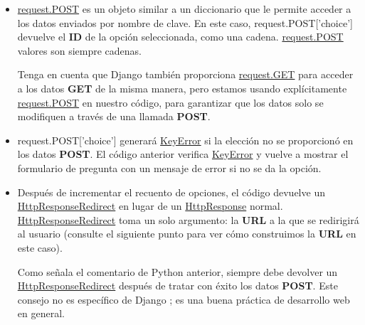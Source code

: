 \documentclass[10pt]{article}
\newcommand{\py}[1]{{\textcolor{B}{Python} #1}}
\newcommand{\django}[1]{{\textcolor{G}{Django} #1}}
\begin{document}
\begin{itemize}
\item
{\href{https://docs.djangoproject.com/en/3.0/ref/request-response/\#django.http.HttpRequest.POST}{\textcolor{B}{request.POST}}}
 es un objeto similar a un diccionario que le permite acceder a los datos enviados por nombre de clave. En este caso, \textcolor{G}{request.POST}\textcolor{R}{['choice']} devuelve el \textbf{ID} de la opción seleccionada, como una cadena. {\href{https://docs.djangoproject.com/en/3.0/ref/request-response/\#django.http.HttpRequest.POST}{\textcolor{B}{request.POST}}}
 valores son siempre cadenas.

Tenga en cuenta que \django también proporciona {\href{https://docs.djangoproject.com/en/3.0/ref/request-response/\#django.http.HttpRequest.GET}{\textcolor{B}{request.GET}}} para acceder a los datos \textbf{GET} de la misma manera, pero estamos usando explícitamente {\href{https://docs.djangoproject.com/en/3.0/ref/request-response/\#django.http.HttpRequest.POST}{\textcolor{B}{request.POST}}} en nuestro código, para garantizar que los datos solo se modifiquen a través de una llamada \textbf{POST}.

\item
\textcolor{G}{request.POST}\textcolor{R}{['choice']} generará {\href{https://docs.python.org/3/library/exceptions.html\#KeyError}{\textcolor{B}{KeyError}}} si la elección no se proporcionó en los datos \textbf{POST}. El código anterior verifica {\href{https://docs.python.org/3/library/exceptions.html\#KeyError}{\textcolor{B}{KeyError}}} y vuelve a mostrar el formulario de pregunta con un mensaje de error si no se da la opción.

\item
Después de incrementar el recuento de opciones, el código devuelve un {\href{https://docs.djangoproject.com/en/3.0/ref/request-response/\#django.http.HttpResponseRedirect}{\textcolor{B}{HttpResponseRedirect}}} en lugar de un {\href{https://docs.djangoproject.com/en/3.0/ref/request-response/\#django.http.HttpResponse}{\textcolor{B}{HttpResponse}}} normal. {\href{https://docs.djangoproject.com/en/3.0/ref/request-response/\#django.http.HttpResponseRedirect}{\textcolor{B}{HttpResponseRedirect}}} toma un solo argumento: la \textbf{URL} a la que se redirigirá al usuario (consulte el siguiente punto para ver cómo construimos la \textbf{URL} en este caso).

Como señala el comentario de \py{} anterior, siempre debe devolver un {\href{https://docs.djangoproject.com/en/3.0/ref/request-response/\#django.http.HttpResponseRedirect}{\textcolor{B}{HttpResponseRedirect}}} después de tratar con éxito los datos \textbf{POST}. Este consejo no es específico de \django{}; es una buena práctica de desarrollo web en general.


\end{itemize}
\end{document}
